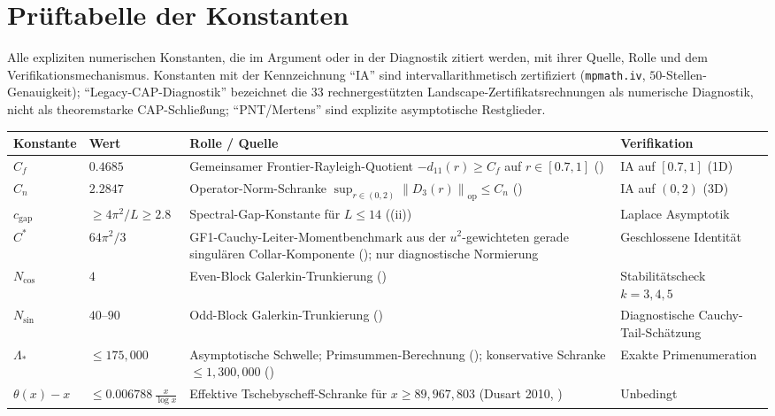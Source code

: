 \documentclass[11pt,a4paper]{article}
\theoremstyle{remark}
\theoremstyle{plain}
\newcommand{\norm}[1]{\left\lVert #1 \right\rVert}
\begin{document}
\appendix

\section{Prüftabelle der Konstanten}
\label{sec:constants-audit}

Alle expliziten numerischen Konstanten, die im Argument oder in der Diagnostik zitiert werden, mit ihrer Quelle, Rolle und dem Verifikationsmechanismus. Konstanten mit der Kennzeichnung ``IA'' sind intervallarithmetisch zertifiziert (\texttt{mpmath.iv}, $50$-Stellen-Genauigkeit); ``Legacy-CAP-Diagnostik'' bezeichnet die $33$ rechnergestützten Landscape-Zertifikatsrechnungen als numerische Diagnostik, nicht als theoremstarke CAP-Schließung; ``PNT/Mertens'' sind explizite asymptotische Restglieder.

\begin{center}
\footnotesize
\renewcommand{\arraystretch}{1.25}
\begin{tabular}{L{2.6cm}|L{2.0cm}|L{6.2cm}|L{2.6cm}}
\textbf{Konstante} & \textbf{Wert} & \textbf{Rolle / Quelle} & \textbf{Verifikation} \\\hline
$C_f$ & $0.4685$ & Gemeinsamer Frontier-Rayleigh-Quotient $-d_{11}(r)\geq C_f$ auf $r\in[0.7,1]$ () & IA auf $[0.7,1]$ (1D)\\
$C_n$ & $2.2847$ & Operator-Norm-Schranke $\sup_{r\in(0,2)}\norm{D_3(r)}_{\mathrm{op}}\leq C_n$ () & IA auf $(0,2)$ (3D)\\
$c_{\mathrm{gap}}$ & $\geq 4\pi^2/L\geq 2.8$ & Spectral-Gap-Konstante für $L\leq 14$ ((ii)) & Laplace Asymptotik\\
$C^*$ & $64\pi^2/3$ & GF1-Cauchy-Leiter-Momentbenchmark aus der \(u^2\)-gewichteten gerade singulären Collar-Komponente (); nur diagnostische Normierung & Geschlossene Identität\\
$N_{\cos}$ & $4$ & Even-Block Galerkin-Trunkierung () & Stabilitätscheck $k=3,4,5$\\
$N_{\sin}$ & $40$--$90$ & Odd-Block Galerkin-Trunkierung () & Diagnostische Cauchy-Tail-Schätzung\\
$\Lambda_*$ & $\leq 175{,}000$ & Asymptotische Schwelle; Primsummen-Berechnung (); konservative Schranke $\leq 1{,}300{,}000$ () & Exakte Primenumeration\\
$\theta(x)-x$ & $\leq 0.006788\,\tfrac{x}{\log x}$ & Effektive Tschebyscheff-Schranke für $x\geq 89{,}967{,}803$ (Dusart 2010, \cite{Dusart2010}) & Unbedingt\\

\end{tabular}
\end{center}
\end{document}
